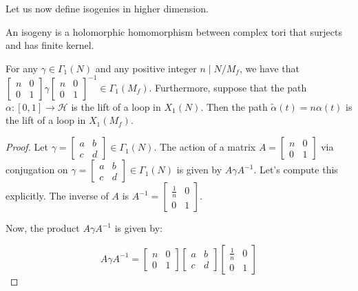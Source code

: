 Let us now define isogenies in higher dimension. 

\begin{definition}
    An isogeny is a holomorphic homomorphism between complex tori that surjects and has finite kernel.
\end{definition}


\begin{lemma}\label{lift}
For any $\gamma \in \Gamma_{1}(N)$ and any positive integer $n \mid N / M_{f}$, we have that \\
$\left[\begin{array}{ll}n & 0 \\ 0 & 1\end{array}\right] \gamma\left[\begin{array}{ll}n & 0 \\ 0 & 1\end{array}\right]^{-1} \in \Gamma_{1}\left(M_{f}\right)$. Furthermore, suppose that the path $\alpha:[0,1] \longrightarrow \mathcal{H}$ is the lift of a loop in $X_{1}(N)$. Then the path $\tilde{\alpha}(t)=n \alpha(t)$ is the lift of a loop in $X_{1}\left(M_{f}\right)$.
\begin{proof}
    Let $\gamma=\left[\begin{array}{ll}a & b \\ c & d\end{array}\right]  \in \Gamma_1(N)$. The action of a matrix \( A = \begin{bmatrix} n & 0 \\ 0 & 1 \end{bmatrix} \) via conjugation on \( \gamma = \begin{bmatrix} a & b \\ c & d \end{bmatrix} \in \Gamma_1(N) \) is given by \( A \gamma A^{-1} \). Let's compute this explicitly. The inverse of \( A \) is \( A^{-1} = \begin{bmatrix} \frac{1}{n} & 0 \\ 0 & 1 \end{bmatrix} \).

Now, the product \( A \gamma A^{-1} \) is given by:

\[ A \gamma A^{-1} = \begin{bmatrix} n & 0 \\ 0 & 1 \end{bmatrix} \begin{bmatrix} a & b \\ c & d \end{bmatrix} \begin{bmatrix} \frac{1}{n} & 0 \\ 0 & 1 \end{bmatrix} \]


\end{proof}
\end{lemma}
